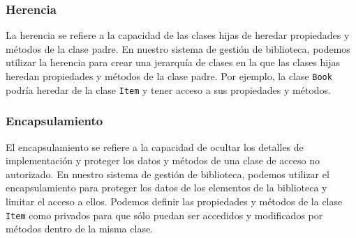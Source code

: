 \documentclass[executivepaper]{article}
\begin{document}
\subsubsection*{Herencia}

La herencia se refiere a la capacidad de las clases hijas de heredar propiedades y métodos de la clase padre. En nuestro sistema de gestión de biblioteca, podemos utilizar la herencia para crear una jerarquía de clases en la que las clases hijas heredan propiedades y métodos de la clase padre. Por ejemplo, la clase \texttt{Book} podría heredar de la clase \texttt{Item} y tener acceso a sus propiedades y métodos.

\subsubsection*{Encapsulamiento}

El encapsulamiento se refiere a la capacidad de ocultar los detalles de implementación y proteger los datos y métodos de una clase de acceso no autorizado. En nuestro sistema de gestión de biblioteca, podemos utilizar el encapsulamiento para proteger los datos de los elementos de la biblioteca y limitar el acceso a ellos. Podemos definir las propiedades y métodos de la clase \texttt{Item} como privados para que sólo puedan ser accedidos y modificados por métodos dentro de la misma clase.
\end{document}
